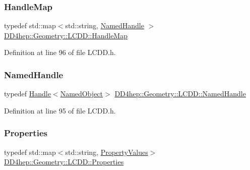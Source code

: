 \subsubsection{\texorpdfstring{Handle\+Map}{HandleMap}}
{\footnotesize\ttfamily typedef std\+::map$<$std\+::string, \hyperlink{class_d_d4hep_1_1_geometry_1_1_l_c_d_d_a5502368683a5c78c91e9f814ff72b705}{Named\+Handle} $>$ \hyperlink{class_d_d4hep_1_1_geometry_1_1_l_c_d_d_a05cb11e7355772c7b0794bcca59bf477}{D\+D4hep\+::\+Geometry\+::\+L\+C\+D\+D\+::\+Handle\+Map}}



Definition at line 96 of file L\+C\+D\+D.\+h.

\hypertarget{class_d_d4hep_1_1_geometry_1_1_l_c_d_d_a5502368683a5c78c91e9f814ff72b705}{}\label{class_d_d4hep_1_1_geometry_1_1_l_c_d_d_a5502368683a5c78c91e9f814ff72b705} 
\subsubsection{\texorpdfstring{Named\+Handle}{NamedHandle}}
{\footnotesize\ttfamily typedef \hyperlink{class_d_d4hep_1_1_handle}{Handle}$<$\hyperlink{class_d_d4hep_1_1_named_object}{Named\+Object}$>$ \hyperlink{class_d_d4hep_1_1_geometry_1_1_l_c_d_d_a5502368683a5c78c91e9f814ff72b705}{D\+D4hep\+::\+Geometry\+::\+L\+C\+D\+D\+::\+Named\+Handle}}



Definition at line 95 of file L\+C\+D\+D.\+h.

\hypertarget{class_d_d4hep_1_1_geometry_1_1_l_c_d_d_a89096744868821bf5dcb0c0560b348c9}{}\label{class_d_d4hep_1_1_geometry_1_1_l_c_d_d_a89096744868821bf5dcb0c0560b348c9} 
\subsubsection{\texorpdfstring{Properties}{Properties}}
{\footnotesize\ttfamily typedef std\+::map$<$std\+::string, \hyperlink{class_d_d4hep_1_1_geometry_1_1_l_c_d_d_a2a0388e0d76c73a3582439953ac3be53}{Property\+Values}$>$ \hyperlink{class_d_d4hep_1_1_geometry_1_1_l_c_d_d_a89096744868821bf5dcb0c0560b348c9}{D\+D4hep\+::\+Geometry\+::\+L\+C\+D\+D\+::\+Properties}}




